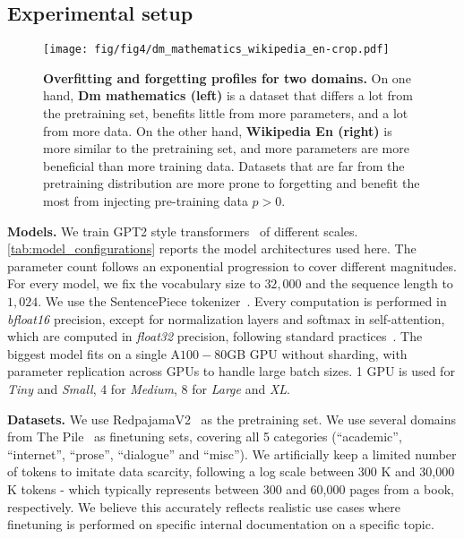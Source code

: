 \subsection{Experimental setup}

\begin{figure*}[t]
    \centering
    \texttt{[image: fig/fig4/dm\_mathematics\_wikipedia\_en-crop.pdf]}
    \caption{\textbf{Overfitting and forgetting profiles for two domains.} On one hand, \textbf{Dm mathematics (left)} is a dataset that differs a lot from the pretraining set, benefits little from more parameters, and a lot from more data. On the other hand, \textbf{Wikipedia En (right)} is more similar to the pretraining set, and more parameters are more beneficial than more training data. Datasets that are far from the pretraining distribution are more prone to forgetting and benefit the most from injecting pre-training data $p>0$.}
    \label{fig:empiricalsscalinglaws}
\end{figure*}


\textbf{Models.}
We train GPT2 style transformers~\citep{radford2019language} of different scales. 
\autoref{tab:model_configurations} reports the model architectures used here. The parameter count follows an exponential progression to cover different magnitudes.  
 For every model, we fix the vocabulary size to $32,000$ and the sequence length to $1,024$. We use the SentencePiece tokenizer~\citep{kudo2018sentencepiece}.
 Every computation is performed in \textit{bfloat16} precision, except for normalization layers and softmax in self-attention, which are computed in \textit{float32} precision, following standard practices~\citep{rabe2021self,wang2024precision}. 
 The biggest model fits on a single A$100-80$GB GPU without sharding, with parameter replication across GPUs to handle large batch sizes. 1 GPU is used for \textit{Tiny} and \textit{Small}, 4 for \textit{Medium}, 8 for \textit{Large} and \textit{XL}.  

\textbf{Datasets.} We use RedpajamaV2~\citep{weber2024redpajama} as the pretraining set.
We use several domains from The Pile~\citep{gao2020pile} as finetuning sets, covering all 5 categories (``academic'', ``internet'', ``prose'', ``dialogue'' and ``misc'').  We artificially keep a limited number of tokens to imitate data scarcity, following a log scale between 300 K and 30,000 K tokens - which typically represents between 300 and 60,000 pages from a book, respectively. We believe this accurately reflects realistic use cases where finetuning is performed on specific internal documentation on a specific topic.

